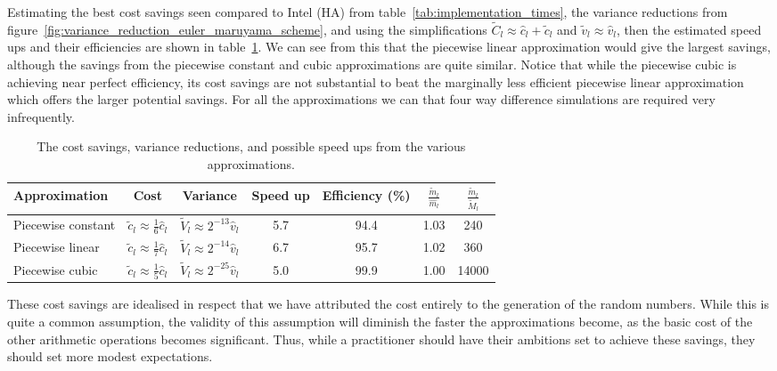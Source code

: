 \documentclass[manuscript,review]{acmart}
\begin{document}
Estimating the best cost savings seen compared to Intel (HA) from table~\ref{tab:implementation_times}, the variance reductions from figure~\ref{fig:variance_reduction_euler_maruyama_scheme}, and using the simplifications $ \tilde{C}_l \approx \hat{c}_l + \tilde{c}_l $ and $ \tilde{v}_l \approx  \hat{v}_l $, then the estimated speed ups and their efficiencies are shown in table~\ref{tab:savings}. We can see from this that the piecewise linear approximation would give the largest savings, although the savings from the piecewise constant and cubic approximations are quite similar. Notice that while the piecewise cubic is achieving near perfect efficiency, its cost savings are not substantial to beat the marginally less efficient piecewise linear approximation which offers the larger potential savings. For all the approximations we can that four way difference simulations are required very infrequently. 

\begin{table}[htb]
\caption{The cost savings, variance reductions, and possible speed ups from the various approximations.}
\label{tab:savings}
\renewcommand{\arraystretch}{1.4}  %
\begin{tabular}{lcccccc}
Approximation  & Cost & Variance & Speed up & Efficiency (\%) & $ \tfrac{\tilde{m}_l}{\hat{m}_l} $ & $ \tfrac{\tilde{m}_l}{\tilde{M}_l} $ \\[0.3em]
\hline
Piecewise constant & $ \tilde{c}_l \approx \tfrac{1}{6}\hat{c}_l $ & $ \tilde{V}_l \approx 2^{-13}\hat{v}_l $ & 5.7 & 94.4 & 1.03 & 240 \\
Piecewise linear  & $ \tilde{c}_l \approx \tfrac{1}{7}\hat{c}_l $& $ \tilde{V}_l \approx 2^{-14}\hat{v}_l $& 6.7 & 95.7 & 1.02 & 360 \\
Piecewise cubic  & $ \tilde{c}_l \approx \tfrac{1}{5}\hat{c}_l $& $ \tilde{V}_l \approx 2^{-25}\hat{v}_l $& 5.0 & 99.9 & 1.00 & 14000\\ 
\end{tabular}
\end{table}

These cost savings are idealised in respect that we have attributed the cost entirely to the generation of the random numbers. While this is quite a common assumption, the validity of this assumption will diminish the faster the approximations become, as the basic cost of the other arithmetic operations becomes significant. Thus, while a practitioner should have their ambitions set to achieve these savings, they should set more modest expectations.
\end{document}
